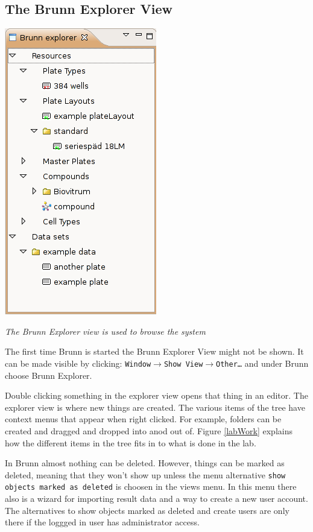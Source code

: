 \documentclass[a4paper,10pt]{article}
\begin{document}
         \subsection{The Brunn Explorer View} 
            \begin{floatingfigure}{0.3\textwidth}
                \begin{center}
                    \includegraphics[width=.2\textwidth]
                                    {images/explorerView.png}
                \end{center}
                \caption{\textit{The Brunn Explorer view is used to browse the
                    system}}
                \label{explorerView}
            \end{floatingfigure}

            \noindent
            The first time Brunn is started the Brunn Explorer View might not
            be shown. It can be made visible by clicking:
            \texttt{Window$\rightarrow$Show View$\rightarrow$Other\ldots} and
            under Brunn choose Brunn Explorer. 

            Double clicking something in the explorer view opens that thing in
            an editor. The explorer view is where new things are created. The
            various items of the tree have context menus that appear when right
            clicked. For example, folders can be created and dragged and
            dropped into anod out of. Figure \ref{labWork} explains how the
            different items in the tree fits in to what is done in the lab.
            
            In Brunn almost nothing can be deleted. However, things can be
            marked as deleted, meaning that they won't show up unless the menu
            alternative \texttt{show objects marked as deleted} is choosen in
            the views menu. In this menu there also is a wizard for importing
            result data and a way to create a new user account. The
            alternatives to show objects marked as deleted and create users are
            only there if the loggged in user has administrator access.
        
\end{document}
